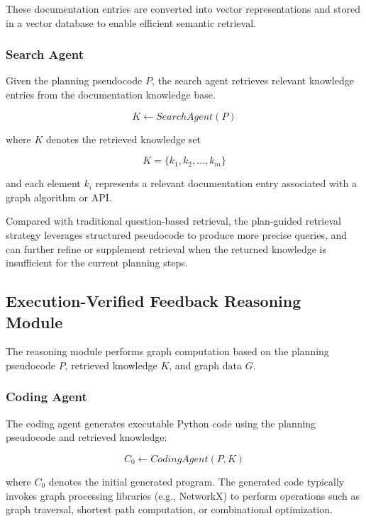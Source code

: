 \documentclass[sigconf,review,anonymous]{acmart}
\begin{document}
These documentation entries are converted into vector
representations and stored in a vector database to enable
efficient semantic retrieval.

\subsubsection{Search Agent}

Given the planning pseudocode $P$, the search agent retrieves
relevant knowledge entries from the documentation knowledge
base.

\begin{equation}
K \leftarrow SearchAgent(P)
\end{equation}

where $K$ denotes the retrieved knowledge set

\begin{equation}
K = \{k_1, k_2, ..., k_m\}
\end{equation}

and each element $k_i$ represents a relevant documentation
entry associated with a graph algorithm or API.

Compared with traditional question-based retrieval, the
plan-guided retrieval strategy leverages structured
pseudocode to produce more precise queries, and can further
refine or supplement retrieval when the returned knowledge
is insufficient for the current planning steps.

\subsection{Execution-Verified Feedback Reasoning Module}

The reasoning module performs graph computation based on the
planning pseudocode $P$, retrieved knowledge $K$, and graph
data $G$.

\subsubsection{Coding Agent}

The coding agent generates executable Python code using the
planning pseudocode and retrieved knowledge:

\begin{equation}
C_0 \leftarrow CodingAgent(P, K)
\end{equation}

where $C_0$ denotes the initial generated program. The
generated code typically invokes graph processing libraries
(e.g., NetworkX) to perform operations such as graph traversal,
shortest path computation, or combinational optimization.
\end{document}
